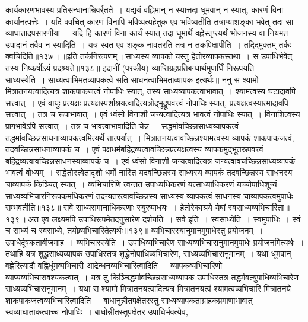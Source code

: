 कार्यकारणभावस्य प्रतिसन्धानान्निवर्र्तते~। यद्ययं वह्निमान् न स्यात्तदा धूमवान् न स्यात्, कारणं विना कार्यानत्पत्तेः~। यदि क्वचित् कारणं विनापि भविष्यत्यहेतुक एव
भविष्यतीति तत्राप्याशङ्का भवेत् तदा सा व्याघातादपसारणीया~। यदि हि कारणं विना कार्यं स्यात् तदा धूमार्थे वह्नेस्तृप्त्यर्थं भोजनस्य वा नियमत उपादानं तवैव न
स्यादिति~। यत्र स्वत एव शङ्क नावतरति तत्र न तर्कापेक्षापीति~। तदिदमुक्तम्-तर्कः क्वचिदिति॥१३७॥
॥इति तर्कनिरूपणम्॥
साध्यस्य व्यापको यस्तु हेतोरव्यापकस्तथा~।
स उपाधिर्भवेत् तस्य निष्कर्षोऽयं प्रदश्र्यते॥१३८॥
इदानीं (परकीय) व्याप्तिग्रहप्रतिबन्धार्थमुपार्धिं निरूपयति~। साध्यस्येति~। साध्यत्वाभिमतव्यापकत्वे सति साधनत्वाभिमताव्यापक इत्यर्थः॥
ननु स श्यामो मित्रातनयत्वादित्यत्र शाकपाकजत्वं नोपाधिः स्यात्, तस्य साध्यव्यापकत्वाभावात्~। श्यामत्वस्य घटादावपि सत्त्वात्~। एवं वायुः प्रत्यक्षः
प्रत्यक्षस्पर्शाश्रयत्वादित्यत्रोद्भूद्रूपवत्त्वं नोपाधिः स्यात्, प्रत्यक्षत्वस्यात्मादावपि सत्त्वात्~। तत्र च रूपाभावात्~। एवं ध्वंसो विनाशी जन्यत्वादित्यत्र भावत्वं नोपाधिः
स्यात्~। विनाशित्वस्य प्रागभावेऽपि सत्त्वात्~। तत्र च भावत्वाभावादिति चेन्न~। सद्धर्मावच्छिन्नसाध्यव्यापकत्वं तद्धर्मावच्छिन्नसाधनाव्यापकत्वमित्यर्थे तात्पर्यात्~।
मित्रातनयत्वावच्छिन्नश्यामत्वस्य व्यापकं शाकपाकजत्वं, तदवच्छिन्नसाधनाव्यापकं च~। एवं पक्षधर्मबहिद्र्रव्यत्वावच्छिन्नप्रत्यक्षत्वस्य व्यापकमुद्भूतरूपवत्त्वं
बहिद्र्रव्यत्वावच्छिन्नसाधनस्याव्यापकं च~। एवं ध्वंसो विनाशी जन्यत्वादित्यत्र जन्यत्वावचच्छिन्नसाध्यव्यापकं भावत्वं बोध्यम्~। सद्धेतोस्त्वेेतादृशो धर्मो नास्ति यदवच्छिन्नस्य
साध्यस्य व्यापकं तदवच्छिन्नस्य साधनस्य चाव्यापकं किञ्चित् स्यात्~। व्यभिचारिणि त्वन्तत उपाध्यधिकरणं यत्साध्याधिकरणं यच्चोपाधिशून्यं साध्यव्यभिचारनिरूपकमधिकरणं
तदन्यतरत्वावच्छिन्नस्य साध्यस्य व्यापकत्वं साधनस्य चाव्यापकत्वमुपाधेः सम्भवतीति॥१३८॥
सर्वे साध्यसमानाधिकरणाः स्युरुपाधयः~।
हेतोरेकाश्रये येषां स्वसाध्यव्यभिचारिता॥१३९॥
अत एव लक्ष्यमपि उपाधिरूपमेतदनुसारेण दर्शयति~। सर्व इति~। स्वसाध्येति~। स्वमुपाधिः~। स्वं च साध्यं च स्वसाध्ये, तयोव्र्यभिचारितेत्यर्थः॥१३९॥
व्यभिचारस्यानुमानमुपाधेस्तु प्रयोजनम्~।
उपाधेर्दूषकताबीजमाह~। व्यभिचारस्येति~। उपाधिव्यभिचारेण साध्यव्यभिचारानुमानमुपाधेः प्रयोजनमित्यर्थः~। तथाहि यत्र शुद्धसाध्यव्यापक उपाधिस्तत्र शुद्धेनोपाधिव्यभिचारेण,
साध्यव्यभिचारानुमानम्~। यथा धूमवान् वह्नेरित्यादौ वह्निर्धूमव्यभिचारी आद्र्रेन्धनव्यभिचारित्वादिति~। व्यापकव्यभिचारिणो व्याप्यव्यभिचारावश्यकत्वात्~। यत्र तु
किञ्चिद्धर्मावच्छिन्नसाध्यव्यापक उपाधिस्तत्र तद्धर्मवत्युपाधिव्यभिचारेण साध्यव्यभिचारानुमानम्~। यथा स श्यामो मित्रातनयत्वादित्यत्र मित्रातनयत्वं श्यामत्वव्यभिचारि
मित्रातनये शाकपाकजत्वव्यभिचारित्वादिति~। बाधानुन्नीतपक्षेतरस्तु साध्यव्यापकताग्राहकप्रमाणाभावात् स्वव्याघाताकत्वाच्च नोपाधिः~। बाधोन्नीतस्तुपक्षेतर उपाधिर्भवत्येव,
